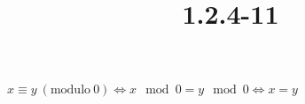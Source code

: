\documentclass{article}
\title{1.2.4-11}
\begin{document}
\maketitle

$x \equiv y\ (\mathrm{modulo}\ 0) \iff x \mod 0 = y \mod 0 \iff x = y$
\end{document}
